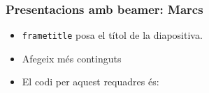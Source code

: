 \begin{frame}
  \frametitle{Presentacions amb beamer: Marcs}
  \begin{itemize}
    \item \texttt{frametitle} posa el títol de la diapositiva.
    \item Afegeix més continguts 
    \item El codi per aquest requadres és: 
  \end{itemize}
\end{frame}

